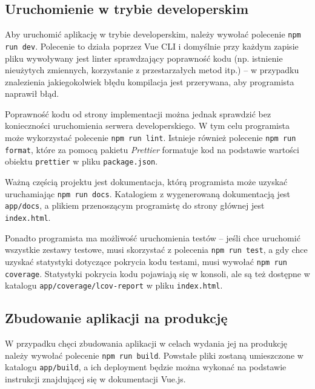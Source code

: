 \documentclass[shortabstract]{iithesis}
\theoremstyle{definition} \newtheorem{definition}{Definicja}[]
\theoremstyle{remark} \newtheorem{remark}[definition]{Observation}
\theoremstyle{plain} \newtheorem{theorem}[definition]{Theorem}
\theoremstyle{plain} \newtheorem{lemma}[definition]{Lemma}
\begin{document}
\subsection{Uruchomienie w trybie developerskim}
Aby uruchomić aplikację w trybie developerskim, należy wywołać polecenie \texttt{npm run dev}. Polecenie to działa poprzez Vue CLI i domyślnie przy każdym zapisie pliku wywoływany jest linter sprawdzający poprawność kodu (np. istnienie nieużytych zmiennych, korzystanie z przestarzałych metod itp.) -- w przypadku znalezienia jakiegokolwiek błędu kompilacja jest przerywana, aby programista naprawił błąd.

Poprawność kodu od strony implementacji można jednak sprawdzić bez konieczności uruchomienia serwera developerskiego. W tym celu programista może wykorzystać polecenie \texttt{npm run lint}. Istnieje również polecenie \texttt{npm run format}, które za pomocą pakietu \textit{Prettier} formatuje kod na podstawie wartości obiektu \texttt{prettier} w pliku \texttt{package.json}.

Ważną częścią projektu jest dokumentacja, którą programista może uzyskać uruchamiając \texttt{npm run docs}. Katalogiem z wygenerowaną dokumentacją jest \texttt{app/docs}, a plikiem przenoszącym programistę do strony głównej jest \texttt{index.html}.

Ponadto programista ma możliwość uruchomienia testów -- jeśli chce uruchomić wszystkie zestawy testowe, musi skorzystać z polecenia \texttt{npm run test}, a gdy chce uzyskać statystyki dotyczące pokrycia kodu testami, musi wywołać \texttt{npm run coverage}. Statystyki pokrycia kodu pojawiają się w konsoli, ale są też dostępne w katalogu \texttt{app/coverage/lcov-report} w pliku \texttt{index.html}.

\subsection{Zbudowanie aplikacji na produkcję}
W przypadku chęci zbudowania aplikacji w celach wydania jej na produkcję należy wywołać polecenie \texttt{npm run build}. Powstałe pliki zostaną umieszczone w katalogu \texttt{app/build}, a ich deployment będzie można wykonać na podstawie instrukcji \cite{bib:vue-firebase-deployment} znajdującej się w dokumentacji Vue.js.


\end{document}
